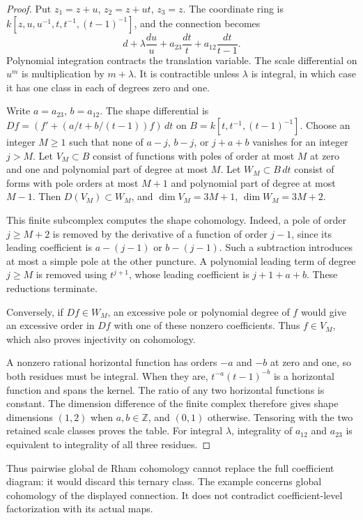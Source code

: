 \begin{proof}
Put $z_1=z+u$, $z_2=z+ut$, $z_3=z$. The coordinate ring is
$k[z,u,u^{-1},t,t^{-1},(t-1)^{-1}]$, and the connection becomes
\[
 d+\lambda\frac{du}{u}
   +a_{23}\frac{dt}{t}+a_{12}\frac{dt}{t-1}.
\]
Polynomial integration contracts the translation variable. The
scale differential on $u^m$ is multiplication by $m+\lambda$.
It is contractible unless $\lambda$ is integral, in which case
it has one class in each of degrees zero and one.

Write $a=a_{23}$, $b=a_{12}$. The shape differential is
$D f=(f'+(a/t+b/(t-1))f)\,dt$ on
$B=k[t,t^{-1},(t-1)^{-1}]$. Choose an integer $M\geq1$ such
that none of $a-j$, $b-j$, or $j+a+b$ vanishes for an integer
$j>M$. Let $V_M\subset B$ consist of functions with poles of
order at most $M$ at zero and one and polynomial part of degree
at most $M$. Let $W_M\subset B\,dt$ consist of forms with pole
orders at most $M+1$ and polynomial part of degree at most $M-1$.
Then $D(V_M)\subset W_M$, and
$\dim V_M=3M+1$, $\dim W_M=3M+2$.

This finite subcomplex computes the shape cohomology. Indeed,
a pole of order $j\geq M+2$ is removed by the derivative of
a function of order $j-1$, since its leading coefficient is
$a-(j-1)$ or $b-(j-1)$. Such a subtraction introduces at most
a simple pole at the other puncture. A polynomial leading term
of degree $j\geq M$ is removed using $t^{j+1}$, whose leading
coefficient is $j+1+a+b$. These reductions terminate.

Conversely,
if $Df\in W_M$, an excessive pole or polynomial degree of $f$
would give an excessive order in $Df$ with one of these nonzero
coefficients. Thus $f\in V_M$, which also proves injectivity
on cohomology.

A nonzero rational horizontal function has orders $-a$ and
$-b$ at zero and one, so both residues must be integral. When
they are, $t^{-a}(t-1)^{-b}$ is a horizontal function and spans
the kernel. The ratio of any two horizontal functions is constant.
The dimension difference of the finite complex therefore gives
shape dimensions $(1,2)$ when $a,b\in\mathbb Z$, and $(0,1)$
otherwise. Tensoring with the two retained scale classes proves
the table. For integral $\lambda$, integrality of $a_{12}$ and
$a_{23}$ is equivalent to integrality of all three residues.
\end{proof}


Thus pairwise global de Rham cohomology cannot replace the full
coefficient diagram: it would discard this ternary class.
The example concerns global cohomology of the displayed connection.
It does not contradict coefficient-level factorization with its
actual maps.

